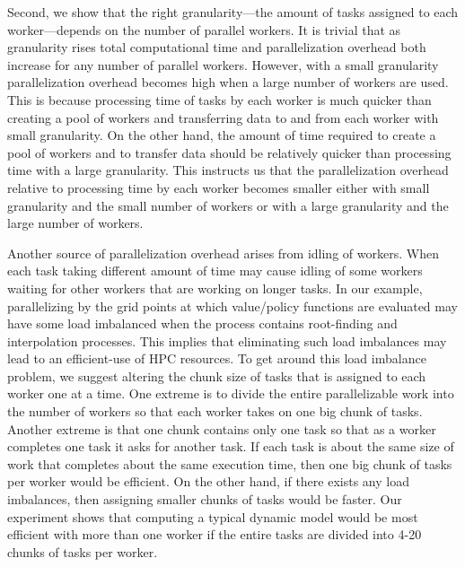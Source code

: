 \documentclass[12pt]{article}
\begin{document}
Second, we show that the right granularity---the amount of tasks assigned to each worker---depends on the number of parallel workers. It is trivial that as granularity rises total computational time and parallelization overhead both increase for any number of parallel workers. However, with a small granularity parallelization overhead becomes high when a large number of workers are used. This is because processing time of tasks by each worker is much quicker than creating a pool of workers and transferring data to and from each worker with small granularity. On the other hand, the amount of time required to create a pool of workers and to transfer data should be relatively quicker than processing time with a large granularity. This instructs us that the parallelization overhead relative to processing time by each worker becomes smaller either with small granularity and the small number of workers or with a large granularity and the large number of workers.




Another source of parallelization overhead arises from idling of workers. When each task taking different amount of time may cause idling of some workers waiting for other workers that are working on longer tasks. In our example, parallelizing by the grid points at which value/policy functions are evaluated may have some load imbalanced when the process contains root-finding and interpolation processes. This implies that eliminating such load imbalances may lead to an efficient-use of HPC resources. To get around this load imbalance problem, we suggest altering the chunk size of tasks that is assigned to each worker one at a time. One extreme is to divide the entire parallelizable work into the number of workers so that each worker takes on one big chunk of tasks. Another extreme is that one chunk contains only one task so that as a worker completes one task it asks for another task. If each task is about the same size of work that completes about the same execution time, then one big chunk of tasks per worker would be efficient. On the other hand, if there exists any load imbalances, then assigning smaller chunks of tasks would be faster. Our experiment shows that computing a typical dynamic model would be most efficient with more than one worker if the entire tasks are divided into 4-20 chunks of tasks per worker.
\end{document}
